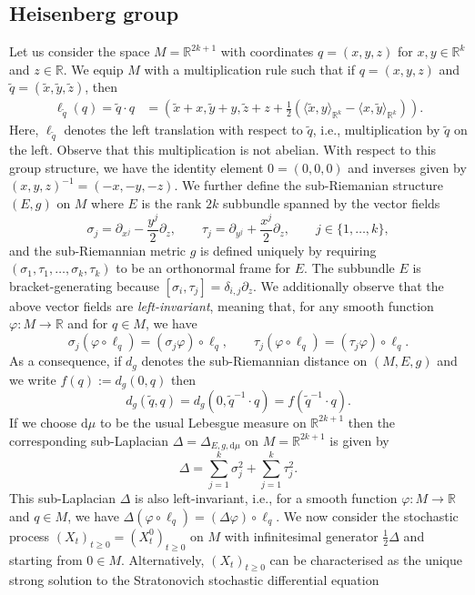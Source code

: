 \documentclass[10pt]{amsart}
\theoremstyle{remark}
\newcommand{\R}{\mathbb{R}}
\newcommand{\db}{{\mathrm d}}
\numberwithin{equation}{section}
\begin{document}
\subsection{Heisenberg group} \label{sec:Heis}
Let us consider the space $M=\mathbb{R}^{2k+1}$ with coordinates $q =(x,y,z)$ for $x,y \in \mathbb{R}^k$ and $z \in \mathbb{R}$. We equip $M$ with a multiplication rule such that if $q = (x,y,z)$ and $\tilde q = (\tilde x, \tilde y, \tilde z)$, then
\begin{align*}
    \ell_{\tilde q}(q) =\tilde q \cdot q
    & = \left(\tilde x+x, \tilde y+y, \tilde z+ z+\frac{1}{2} \left(\langle \tilde x, y \rangle_{\mathbb{R}^k} - \langle x, \tilde y\rangle_{\mathbb{R}^k}\right) \right).
\end{align*} 
Here, $\ell_{\tilde q}$ denotes the left translation with respect to $\tilde q$, i.e., multiplication by $\tilde q$ on the left. Observe that this multiplication is not abelian. With respect to this group structure, we have the identity element $0 =(0,0,0)$ and inverses given by $(x,y,z)^{-1} = (-x,-y,-z)$. We further define the sub-Riemanian structure $(E,g)$ on $M$ where $E$ is the rank $2k$ subbundle spanned by the vector fields
$$\sigma_j = \partial_{x^j} - \frac{y^j}{2} \partial_z, \qquad  \tau_j = \partial_{y^j} + \frac{x^j}{2} \partial_z, \qquad j\in\{1, \dots, k\},$$
and the sub-Riemannian metric $g$ is defined uniquely by requiring $(\sigma_1,\tau_1,\dots,\sigma_k,\tau_k)$ to be an orthonormal frame for $E$. The subbundle $E$ is bracket-generating because $[\sigma_i, \tau_j] = \delta_{i,j} \partial_z$.
We additionally observe that the above vector fields are \emph{left-invariant}, meaning that, for any smooth function $\varphi\colon M\to\R$ and for $q\in M$, we have
$$\sigma_j (\varphi \circ \ell_q) = (\sigma_j \varphi) \circ \ell_q,\qquad \tau_j(\varphi \circ \ell_q) = (\tau_j \varphi) \circ \ell_q.$$
As a consequence, if $d_g$ denotes the sub-Riemannian distance on $(M,E,g)$ and we write $f(q) := d_g(0,q)$ then
$$d_g(\tilde q, q) = d_g(0, \tilde q^{-1} \cdot  q) = f( \tilde q^{-1} \cdot q)  .$$
If we choose $\db\mu$ to be the usual Lebesgue measure on $\mathbb{R}^{2k+1}$ then the corresponding sub-Laplacian $\Delta=\Delta_{E,g,\db\mu}$ on $M=\R^{2k+1}$ is given by
$$\Delta = \sum_{j=1}^k \sigma_j^2 + \sum_{j=1}^k \tau_j^2.$$
This sub-Laplacian $\Delta$ is also left-invariant, i.e., for a smooth function $\varphi\colon M\to\R$ and $q\in M$, we have $\Delta (\varphi \circ \ell_q) = (\Delta \varphi) \circ \ell_q$. We now consider the stochastic process $(X_t)_{t\geq 0} = (X_t^{0})_{t\geq 0}$ on $M$ with infinitesimal generator $\frac{1}{2}\Delta$ and starting from $0\in M$. Alternatively, $(X_t)_{t\geq 0}$ can be characterised as the unique strong solution to the Stratonovich stochastic differential equation
\end{document}
